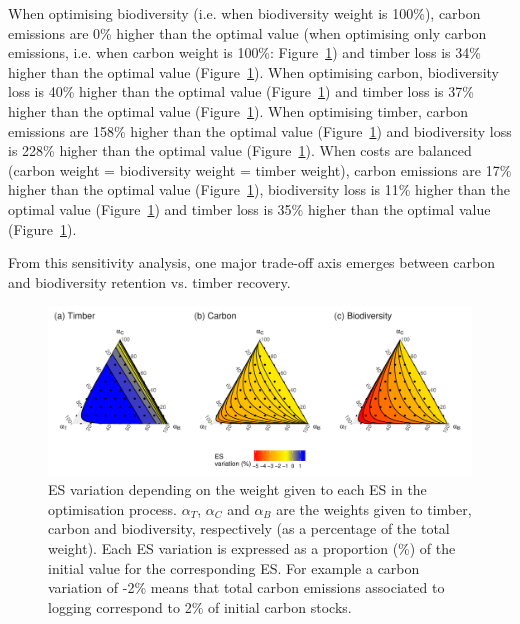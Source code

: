 \documentclass{article}
\begin{document}
When optimising biodiversity (i.e. when biodiversity weight is 100\%), carbon emissions are 0\% higher than the optimal value (when optimising only carbon emissions, i.e. when carbon weight is 100\%: Figure~\ref{fig:changeCosts}) and timber loss is 34\% higher than the optimal value (Figure~\ref{fig:changeCosts}). When optimising carbon, biodiversity loss is 40\% higher than the optimal value (Figure~\ref{fig:changeCosts}) and timber loss is 37\% higher than the optimal value (Figure~\ref{fig:changeCosts}). When optimising timber, carbon emissions are 158\% higher than the optimal value (Figure~\ref{fig:changeCosts}) and biodiversity loss is 228\% higher than the optimal value (Figure~\ref{fig:changeCosts}).  When costs are balanced (carbon weight = biodiversity weight = timber weight), carbon emissions are 17\% higher than the optimal value (Figure~\ref{fig:changeCosts}), biodiversity loss is 11\% higher than the optimal value (Figure~\ref{fig:changeCosts}) and timber loss is 35\% higher than the optimal value (Figure~\ref{fig:changeCosts}). 

From this sensitivity analysis, one major trade-off axis emerges between carbon and biodiversity retention vs. timber recovery. 

\begin{figure}
    \centering
    \includegraphics[width=\textwidth]{graphs/changingESweights.pdf}
    \caption{ES variation depending on the weight given to each ES in the optimisation process. $\alpha_T$, $\alpha_C$ and $\alpha_B$ are the weights given to timber, carbon and biodiversity, respectively (as a percentage of the total weight). Each ES variation is expressed as a proportion (\%) of the initial value for the corresponding ES. For example a carbon variation of -2\% means that total carbon emissions associated to logging correspond to 2\% of initial carbon stocks.} 
    \label{fig:changeCosts}
\end{figure}


\clearpage
\end{document}

